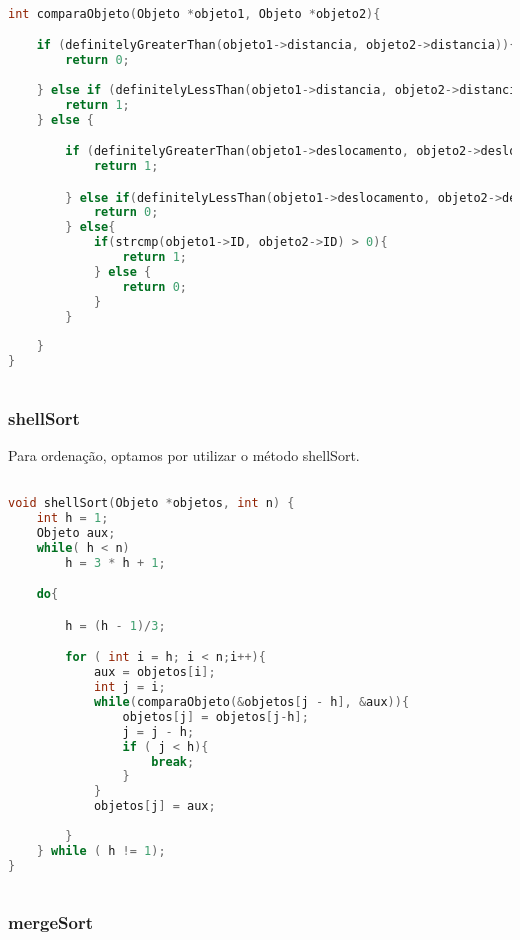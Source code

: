 \documentclass{article}
\begin{document}
\begin{lstlisting}[caption={Função comparaObjetos},label={lst:cod7},language=C]

int comparaObjeto(Objeto *objeto1, Objeto *objeto2){

    if (definitelyGreaterThan(objeto1->distancia, objeto2->distancia)){
        return 0;
        
    } else if (definitelyLessThan(objeto1->distancia, objeto2->distancia)){
        return 1;
    } else {

        if (definitelyGreaterThan(objeto1->deslocamento, objeto2->deslocamento)) {
            return 1;

        } else if(definitelyLessThan(objeto1->deslocamento, objeto2->deslocamento)){
            return 0;
        } else{
            if(strcmp(objeto1->ID, objeto2->ID) > 0){
                return 1;
            } else {
                return 0;
            }
        }
        
    }
}
    
\end{lstlisting}

\subsubsection{shellSort}

Para ordenação, optamos por utilizar o método shellSort.

\begin{lstlisting}[caption={Função shellSort},label={lst:cod7},language=C]

void shellSort(Objeto *objetos, int n) {
    int h = 1;
    Objeto aux;
    while( h < n)
        h = 3 * h + 1;

    do{

        h = (h - 1)/3;

        for ( int i = h; i < n;i++){
            aux = objetos[i]; 
            int j = i;
            while(comparaObjeto(&objetos[j - h], &aux)){
                objetos[j] = objetos[j-h];
                j = j - h;
                if ( j < h){
                    break;
                }
            }
            objetos[j] = aux;
            
        }
    } while ( h != 1); 
}
    
\end{lstlisting}


\subsubsection{mergeSort}
\end{document}
